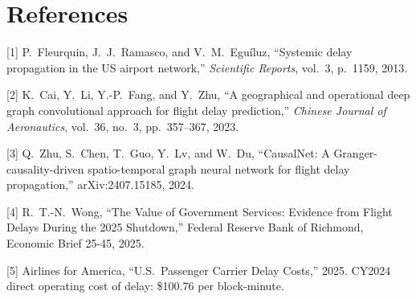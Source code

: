 \documentclass[11pt]{article}
\begin{document}
\section*{References}
{\small
[1] P.\ Fleurquin, J.\ J.\ Ramasco, and V.\ M.\ Egu\'iluz, ``Systemic delay
propagation in the US airport network,'' \textit{Scientific Reports}, vol.\ 3,
p.\ 1159, 2013.

[2] K.\ Cai, Y.\ Li, Y.-P.\ Fang, and Y.\ Zhu, ``A geographical and operational
deep graph convolutional approach for flight delay prediction,'' \textit{Chinese
Journal of Aeronautics}, vol.\ 36, no.\ 3, pp.\ 357--367, 2023.
                          
[3] Q.\ Zhu, S.\ Chen, T.\ Guo, Y.\ Lv, and W.\ Du, ``CausalNet: A
Granger-causality-driven spatio-temporal graph neural network for flight delay
propagation,'' arXiv:2407.15185, 2024.

[4] R.\ T.-N.\ Wong, ``The Value of Government Services: Evidence from Flight
Delays During the 2025 Shutdown,'' Federal Reserve Bank of Richmond, Economic
Brief 25-45, 2025.

[5] Airlines for America, ``U.S.\ Passenger Carrier Delay Costs,'' 2025.
CY2024 direct operating cost of delay: \$100.76 per block-minute.
}
\end{document}
